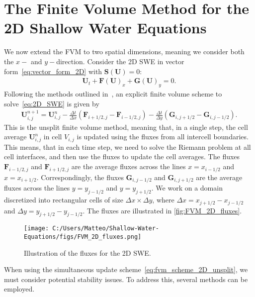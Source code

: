 \section{The Finite Volume Method for the 2D Shallow Water Equations}
We now extend the FVM to two spatial dimensions, meaning we consider both the $x-$ and $y-$direction.
Consider the 2D SWE in vector form~\eqref{eq:vector_form_2D} with $\mathbf{S(U)} = 0$:
\begin{align}\label{eq:2D_SWE}
    \mathbf{U}_t + \mathbf{F(U)}_x + \mathbf{G(U)}_y = 0.
\end{align}
Following the methods outlined in~\cite{Toro2009-Riemann}, an explicit finite volume scheme to solve~\eqref{eq:2D_SWE} is given by
\begin{align}\label{eq:fvm_scheme_2D_unsplit}
    \mathbf{U}_{i,j}^{n+1} = \mathbf{U}_{i,j}^n - \frac{\Delta t}{\Delta x}(\mathbf{F}_{i+1/2,j} - \mathbf{F}_{i-1/2,j}) - \frac{\Delta t}{\Delta y}(\mathbf{G}_{i,j+1/2} - \mathbf{G}_{i,j-1/2}).
\end{align}
This is the unsplit finite volume method, meaning that, in a single step, the cell average $\mathbf{U}_{i,j}^n$ in cell $V_{i,j}$ is updated using the fluxes from all intercell boundaries.
This means, that in each time step, we need to solve the Riemann problem at all cell interfaces, and then use the fluxes to update the cell averages.
The fluxes $\mathbf{F}_{i-1/2,j}$ and $\mathbf{F}_{i+1/2,j}$ are the average fluxes across the lines $x = x_{i-1/2}$ and $x = x_{i+1/2}$.
Correspondingly, the fluxes $\mathbf{G}_{i,j-1/2}$ and $\mathbf{G}_{i,j+1/2}$ are the average fluxes across the lines $y = y_{j-1/2}$ and $y = y_{j+1/2}$.
We work on a domain discretized into rectangular cells of size $\Delta x \times \Delta y$, where $\Delta x = x_{j + 1/2} - x_{j - 1/2} $ and $\Delta y = y_{j + 1/2} - y_{j - 1/2}$.
The fluxes are illustrated in \autoref{fig:FVM_2D_fluxes}.
\begin{figure}[H]
    \centering
    \texttt{[image: C:/Users/Matteo/Shallow-Water-Equations/figs/FVM\_2D\_fluxes.png]}
    \caption{Illustration of the fluxes for the 2D SWE.}\label{fig:FVM_2D_fluxes}
\end{figure}
When using the simultaneous update scheme~\eqref{eq:fvm_scheme_2D_unsplit}, we must consider potential stability issues.
To address this, several methods can be employed.

